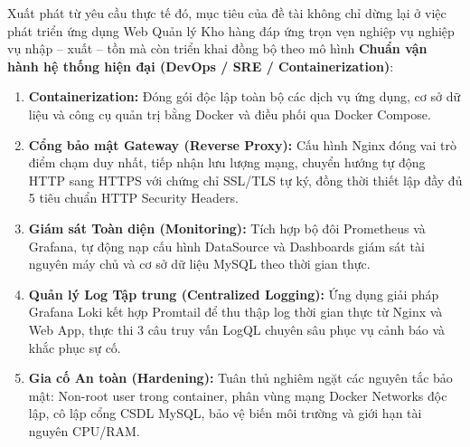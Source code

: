 \documentclass[12pt,a4paper,oneside]{report}
\begin{document}
Xuất phát từ yêu cầu thực tế đó, mục tiêu của đề tài không chỉ dừng lại ở việc phát triển ứng dụng Web Quản lý Kho hàng đáp ứng trọn vẹn nghiệp vụ nghiệp vụ nhập -- xuất -- tồn mà còn triển khai đồng bộ theo mô hình \textbf{Chuẩn vận hành hệ thống hiện đại (DevOps / SRE / Containerization)}:
\begin{enumerate}
    \item \textbf{Containerization:} Đóng gói độc lập toàn bộ các dịch vụ ứng dụng, cơ sở dữ liệu và công cụ quản trị bằng Docker và điều phối qua Docker Compose.
    \item \textbf{Cổng bảo mật Gateway (Reverse Proxy):} Cấu hình Nginx đóng vai trò điểm chạm duy nhất, tiếp nhận lưu lượng mạng, chuyển hướng tự động HTTP sang HTTPS với chứng chỉ SSL/TLS tự ký, đồng thời thiết lập đầy đủ 5 tiêu chuẩn HTTP Security Headers.
    \item \textbf{Giám sát Toàn diện (Monitoring):} Tích hợp bộ đôi Prometheus và Grafana, tự động nạp cấu hình DataSource và Dashboards giám sát tài nguyên máy chủ và cơ sở dữ liệu MySQL theo thời gian thực.
    \item \textbf{Quản lý Log Tập trung (Centralized Logging):} Ứng dụng giải pháp Grafana Loki kết hợp Promtail để thu thập log thời gian thực từ Nginx và Web App, thực thi 3 câu truy vấn LogQL chuyên sâu phục vụ cảnh báo và khắc phục sự cố.
    \item \textbf{Gia cố An toàn (Hardening):} Tuân thủ nghiêm ngặt các nguyên tắc bảo mật: Non-root user trong container, phân vùng mạng Docker Networks độc lập, cô lập cổng CSDL MySQL, bảo vệ biến môi trường và giới hạn tài nguyên CPU/RAM.
\end{enumerate}
\end{document}

